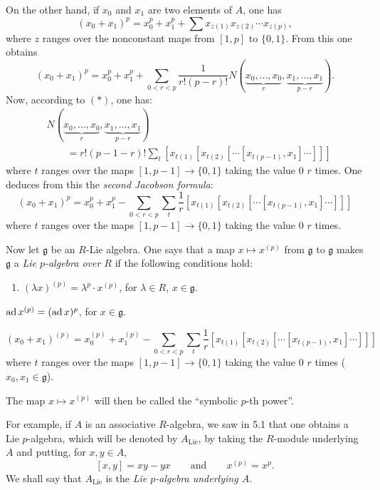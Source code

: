 On the other hand, if $x_0$ and $x_1$ are two elements of $A$, one has
\[
(x_0+x_1)^p=x_0^p+x_1^p+\sum x_{z(1)}x_{z(2)}\cdots x_{z(p)},
\]
where $z$ ranges over the nonconstant maps from $[1,p]$ to $\{0,1\}$. From this one obtains
\[
(x_0+x_1)^p=x_0^p+x_1^p+\sum_{0<r<p}\frac1{r!(p-r)!}N(\underbrace{x_0,\ldots,x_0}_r,\underbrace{x_1,\ldots,x_1}_{p-r}).
\]
Now, according to $(*)$, one has:
\[
\begin{aligned}
&N(\underbrace{x_0,\ldots,x_0}_r,\underbrace{x_1,\ldots,x_1}_{p-r})\\
&\qquad=r!(p-1-r)!\sum_t[x_{t(1)}[x_{t(2)}[\cdots[x_{t(p-1)},x_1]\cdots]]]
\end{aligned}
\]
where $t$ ranges over the maps $[1,p-1]\to\{0,1\}$ taking the value $0$ $r$ times. One deduces from this the \emph{second Jacobson formula}:
\begin{equation}\tag{ii}
(x_0+x_1)^p=x_0^p+x_1^p-\sum_{0<r<p}\sum_t\frac1r[x_{t(1)}[x_{t(2)}[\cdots[x_{t(p-1)},x_1]\cdots]]]
\end{equation}
where $t$ ranges over the maps $[1,p-1]\to\{0,1\}$ taking the value $0$ $r$ times.

Now let $\mathfrak g$ be an $R$-Lie algebra. One says that a map $x\mapsto x^{(p)}$ from $\mathfrak g$ to $\mathfrak g$ makes $\mathfrak g$ a \emph{Lie $p$-algebra over $R$} if the following conditions hold:
\begin{enumerate}[label=\textup{(\arabic*)},start=0]
\item $(\lambda x)^{(p)}=\lambda^p\cdot x^{(p)}$, for $\lambda\in R$, $x\in\mathfrak g$.
\end{enumerate}
\begin{enumeratei}
\item $\operatorname{ad} x^{(p)}=(\operatorname{ad} x)^p$, for $x\in\mathfrak g$.
\item
\[
(x_0+x_1)^{(p)}=x_0^{(p)}+x_1^{(p)}-\sum_{0<r<p}\sum_t\frac1r[x_{t(1)}[x_{t(2)}[\cdots[x_{t(p-1)},x_1]\cdots]]]
\]
where $t$ ranges over the maps $[1,p-1]\to\{0,1\}$ taking the value $0$ $r$ times ($x_0,x_1\in\mathfrak g$).
\end{enumeratei}
The map $x\mapsto x^{(p)}$ will then be called the ``symbolic $p$-th power''.

For example, if $A$ is an associative $R$-algebra, we saw in 5.1 that one obtains a Lie $p$-algebra, which will be denoted by $A_{\mathrm{Lie}}$, by taking the $R$-module underlying $A$ and putting, for $x,y\in A$,
\[
[x,y]=xy-yx\qquad\text{and}\qquad x^{(p)}=x^p.
\]
We shall say that $A_{\mathrm{Lie}}$ is the \emph{Lie $p$-algebra underlying $A$}.

